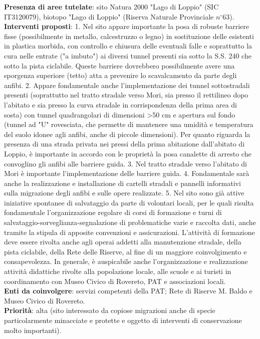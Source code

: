 \documentclass[11pt,a4paper,twoside]{memoir}
\begin{document}
\textbf{Presenza di aree tutelate}: sito Natura 2000 "Lago di Loppio" (SIC IT3120079), biotopo "Lago di Loppio" (Riserva Naturale Provinciale $n^{\circ}$63). \\
\textbf{Interventi proposti}: 1. Nel sito appare importante la posa di robuste barriere fisse (possibilmente in metallo, calcestruzzo o legno) in sostituzione delle esistenti in plastica morbida, con controllo e chiusura delle eventuali falle e soprattutto la cura nelle entrate ("a imbuto") ai diversi tunnel presenti sia sotto la S.S. 240 che sotto la pista ciclabile. Queste barriere dovrebbero possibilmente avere una sporgenza superiore (tetto) atta a prevenire lo scavalcamento da parte degli anfibi. 2. Appare fondamentale anche l'implementazione dei tunnel sottostradali presenti (soprattutto nel tratto stradale verso Mori, sia presso il rettilineo dopo l'abitato e sia presso la curva stradale in corrispondenza della prima area di sosta) con tunnel quadrangolari di dimensioni >50 cm e apertura sul fondo (tunnel ad "U" rovesciata, che permette di mantenere una umidità e temperatura del suolo idonee agli anfibi, anche di piccole dimensioni). Per quanto riguarda la presenza di una strada privata nei pressi della prima abitazione dall'abitato di Loppio, è importante in accordo con le proprietà la posa canalette di arresto che convoglino gli anfibi alle barriere guida. 3. Nel tratto stradale verso l'abitato di Mori è importante l'implementazione delle barriere guida. 4. Fondamentale sarà anche la realizzazione e installazione di cartelli stradali e pannelli informativi sulla migrazione degli anfibi e sulle opere realizzate. 5. Nel sito sono già attive iniziative spontanee di salvataggio da parte di volontari locali, per le quali risulta fondamentale l'organizzazione regolare di corsi di formazione e turni di salvataggio-sorveglianza-segnalazione di problematiche varie e raccolta dati, anche tramite la stipula di apposite convenzioni e assicurazioni. L'attività di formazione deve essere rivolta anche agli operai addetti alla manutenzione stradale, della pista ciclabile, della Rete delle Riserve, al fine di un maggiore coinvolgimento e consapevolezza. In generale, è auspicabile anche l'organizzazione e realizzazione attività didattiche rivolte alla popolazione locale, alle scuole e ai turisti in coordinamento con Museo Civico di Rovereto, PAT e associazioni locali. \\
\textbf{Enti da coinvolgere}: servizi competenti della PAT; Rete di Riserve M. Baldo e Museo Civico di Rovereto. \\
\textbf{Priorità}: alta (sito interessato da copiose migrazioni anche di specie particolarmente minacciate e protette e oggetto di interventi di conservazione molto importanti).
\end{document}
